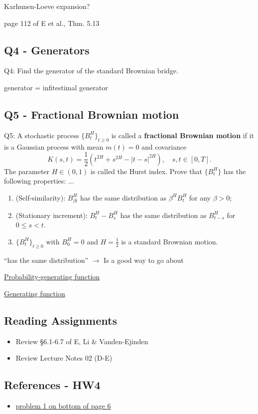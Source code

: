 \begin{quest}
	\item Karhunen-Loeve expansion?
	\begin{ans}
		page 112 of E et al., Thm. 5.13
	\end{ans}
\end{quest}

\subsection{Q4 - Generators}
Q4: Find the generator of the standard Brownian bridge. 

generator = infitestimal generator

\subsection{Q5 - Fractional Brownian motion}
Q5: A stochastic process $\{ B_t^H \}_{t\geq 0}$ is called a \textbf{fractional Brownian motion} if it is a Gaussian process with mean $m(t) = 0$ and covariance 
\[ K(s, t) = \frac{1}{2} (t^{2H} + s^{2H} - |t - s|^{2H} ), 
	\quad s, t \in [0, T].\] 
The parameter $H\in(0,1)$ is called the Hurst index. Prove that $\{B_t^H\}$ has the following properties: ... 

\begin{enumerate}
\item %
(Self-similarity): $B_{\beta t}^H$ has the same distribution as $\beta^H B_t^H$ for any $\beta > 0$;

\item %
(Stationary increment): $B_t^H - B_s^H$ has the same distribution as $B_{t-s}^H$ for $0 \leq s < t$.

\item %
$\{B_t^H\}_{t\geq 0}$ with $B_0^H = 0$ and $H = \frac{1}{2}$ is a standard Brownian motion.
\end{enumerate} %

``has the same distribution'' $\to$ Is a good way to go about 






\href{https://en.wikipedia.org/wiki/Probability-generating_function}{Probability-generating function}

\href{https://en.wikipedia.org/wiki/Generating_function}{Generating function}

\subsection{Reading Assignments}
\begin{itemize}
	\item Review \S 6.1-6.7 of E, Li \& Vanden-Ejinden
	\item Review Lecture Notes 02 (D-E)
\end{itemize}

\subsection{References - HW4}
\begin{itemize}
  \item \href{http://web.math.ku.dk/noter/filer/vidsand12.pdf}{problem 1 on  bottom of page 6}
\end{itemize}
